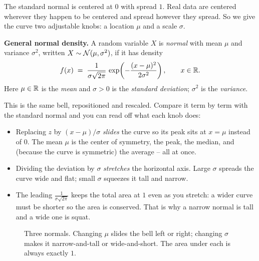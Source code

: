 The standard normal is centered at $0$ with spread $1$. Real data are centered
wherever they happen to be centered and spread however they spread. So we give
the curve two adjustable knobs: a location $\mu$ and a scale $\sigma$.

\begin{formalbox}
\textbf{General normal density.} A random variable $X$ is \emph{normal} with mean
$\mu$ and variance $\sigma^2$, written $X \sim \mathcal{N}(\mu, \sigma^2)$, if it has
density
\[
  f(x) \;=\; \frac{1}{\sigma\sqrt{2\pi}}\,
              \exp\!\left(-\frac{(x-\mu)^2}{2\sigma^2}\right),
  \qquad x \in \mathbb{R}.
\]
Here $\mu \in \mathbb{R}$ is the \emph{mean} and $\sigma > 0$ is the \emph{standard
deviation}; $\sigma^2$ is the \emph{variance}.
\end{formalbox}

This is the same bell, repositioned and rescaled. Compare it term by term with
the standard normal and you can read off what each knob does:

\begin{itemize}
  \item Replacing $z$ by $(x-\mu)/\sigma$ \emph{slides} the curve so its peak sits
  at $x=\mu$ instead of $0$. The mean $\mu$ is the center of symmetry, the peak,
  the median, and (because the curve is symmetric) the average -- all at once.
  \item Dividing the deviation by $\sigma$ \emph{stretches} the horizontal axis.
  Large $\sigma$ spreads the curve wide and flat; small $\sigma$ squeezes it tall
  and narrow.
  \item The leading $\tfrac{1}{\sigma\sqrt{2\pi}}$ keeps the total area at $1$ even
  as you stretch: a wider curve must be shorter so the area is conserved. That is
  why a narrow normal is tall and a wide one is squat.
\end{itemize}

\begin{figure}[H]
\centering
{}
\caption{Three normals. Changing $\mu$ slides the bell left or right; changing
$\sigma$ makes it narrow-and-tall or wide-and-short. The area under each is
always exactly $1$.}
\label{ch12:fig-three}
\end{figure}

